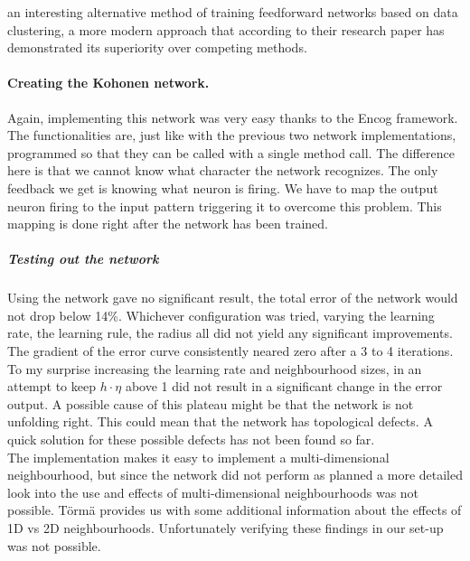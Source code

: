 \documentclass[pdftex,a4paper,12pt,twoside]{report}
\theoremstyle{plain} \newtheorem{theorem}{Theorem} \newtheorem{proposition}{Proposition} \newtheorem{lemma}{Lemma} \newtheorem*{corollary}{Corollary}
\theoremstyle{definition} \newtheorem{definition}{Definition} \newtheorem{conjecture}{Conjecture} \newtheorem*{example}{Example} \newtheorem{algorithm}{Algorithm}
\theoremstyle{remark} \newtheorem*{remark}{Remark} \newtheorem*{note}{Note} \newtheorem{case}{Case}
\begin{document}
an interesting alternative method of training feedforward networks based on data clustering\citep{Jiang2003}, a more modern approach that according to their research paper has demonstrated its superiority over competing methods.
\paragraph{Creating the Kohonen network.}
Again, implementing this network was very easy thanks to the Encog framework. The functionalities are, just like with the previous two network implementations, programmed so that they can be called with a single method call. The difference here is that we cannot know what character the network recognizes. The only feedback we get is knowing what neuron is firing. We have to map the output neuron firing to the input pattern triggering it to overcome this problem. This mapping is done right after the network has been trained. 
\subparagraph{Testing out the network}
Using the network gave no significant result, the total error of the network would not drop below 14\%. Whichever configuration was tried, varying the learning rate, the learning rule, the radius all did not yield any significant improvements. The gradient of the error curve consistently neared zero after a  3 to 4 iterations. To my surprise increasing the learning rate and neighbourhood sizes, in an attempt to keep $h \cdot \eta$ above 1 did not result in a significant change in the error output. A possible cause of this plateau might be that the network is not unfolding right. This could mean that the network has topological defects. A quick solution for these possible defects has not been found so far.\\
The implementation makes it easy to implement a multi-dimensional neighbourhood, but since the network did not perform as planned a more detailed look into the use and effects of multi-dimensional neighbourhoods was not possible. Törmä \citep{Torma1995} provides us with some additional information about the effects of 1D vs 2D neighbourhoods. Unfortunately verifying these findings in our set-up was not possible.

\cleardoublepage
\end{document}
